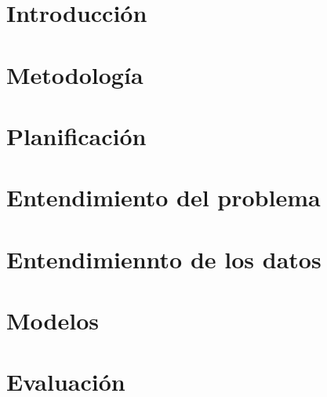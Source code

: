 \documentclass[openright,twoside,10pt]{book}
\begin{document}
\tableofcontents %

\cleardoublepage
{} %
\listoffigures %

\cleardoublepage
{} %
\listoftables %

\clearpage

\printglossary[title=Glosario de términos, toctitle=Glosario de términos]
\glsaddall
\clearpage

\printglossary[type=\acronymtype]

\chapter{Introducción}\label{cap.introduccion}


\chapter{Metodología}\label{cap.metodologia}


\chapter{Planificación}
\label{cap.req-planificacion}

\chapter{Entendimiento del problema}\label{cap.ent.problema}


\chapter{Entendimiennto de los datos}\label{cap.ent-datos}


\chapter{Modelos}\label{cap.modelos}


\chapter{Evaluación}\label{cap.test}

\end{document}
